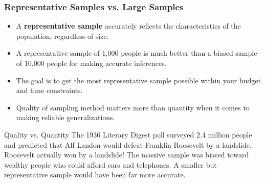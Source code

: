 \documentclass{beamer}
\begin{document}
	\begin{frame}
		\frametitle{Representative Samples vs. Large Samples}
		
		\begin{itemize}
			\item A \textbf{representative sample} accurately reflects the characteristics of the population, regardless of size.
			\item A representative sample of 1,000 people is much better than a biased sample of 10,000 people for making accurate inferences.
			\item The goal is to get the most representative sample possible within your budget and time constraints.
			\item Quality of sampling method matters more than quantity when it comes to making reliable generalizations.
		\end{itemize}
		
		\begin{alertblock}{Quality vs. Quantity}
			The 1936 Literary Digest poll surveyed 2.4 million people and predicted that Alf Landon would defeat Franklin Roosevelt by a landslide. Roosevelt actually won by a landslide! The massive sample was biased toward wealthy people who could afford cars and telephones. A smaller but representative sample would have been far more accurate.
		\end{alertblock}
		
		\end{frame}

\end{document}
